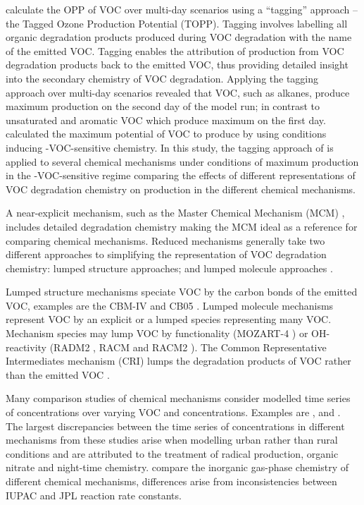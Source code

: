 \citet{Butler:2011} calculate the OPP of VOC over multi-day scenarios using a ``tagging'' approach -- the Tagged Ozone Production Potential (TOPP). 
Tagging involves labelling all organic degradation products produced during VOC degradation with the name of the emitted VOC.
Tagging enables the attribution of  production from VOC degradation products back to the emitted VOC, thus providing detailed insight into the secondary chemistry of VOC degradation.
Applying the tagging approach over multi-day scenarios revealed that VOC, such as alkanes, produce maximum  production on the second day of the model run; in contrast to unsaturated and aromatic VOC which produce maximum  on the first day.
\citet{Butler:2011} calculated the maximum potential of VOC to produce  by using  conditions inducing -VOC-sensitive chemistry.
In this study, the tagging approach of \citet{Butler:2011} is applied to several chemical mechanisms under conditions of maximum  production in the -VOC-sensitive regime comparing the effects of different representations of VOC degradation chemistry on  production in the different chemical mechanisms.

A near-explicit mechanism, such as the Master Chemical Mechanism (MCM) \citep{Jenkin:2003, Saunders:2003, Bloss:2005}, includes detailed degradation chemistry making the MCM ideal as a reference for comparing chemical mechanisms.
Reduced mechanisms generally take two different approaches to simplifying the representation of VOC degradation chemistry: lumped structure approaches; and lumped molecule approaches \citep{Dodge:2000}. 

Lumped structure mechanisms speciate VOC by the carbon bonds of the emitted VOC, examples are the CBM-IV \citep{Gery:1989} and CB05 \citep{Yarwood:2005}.
Lumped molecule mechanisms represent VOC by an explicit or a lumped species representing many VOC. 
Mechanism species may lump VOC by functionality (MOZART-4 \citep{Emmons:2010}) or OH-reactivity (RADM2 \citep{Stockwell:1990}, RACM \citep{Stockwell:1997} and RACM2 \citep{Goliff:2013}).
The Common Representative Intermediates mechanism (CRI) lumps the degradation products of VOC rather than the emitted VOC \citep{Jenkin:2008}.

Many comparison studies of chemical mechanisms consider modelled time series of  concentrations over varying VOC and  concentrations.
Examples are \citet{Dunker:1984}, \citet{Kuhn:1998} and \citet{Emmerson:2009}.
The largest discrepancies between the time series of  concentrations in different mechanisms from these studies arise when modelling urban rather than rural conditions and are attributed to the treatment of radical production, organic nitrate and night-time chemistry.
\citet{Emmerson:2009} compare the inorganic gas-phase chemistry of different chemical mechanisms, differences arise from inconsistencies between IUPAC and JPL reaction rate constants.

